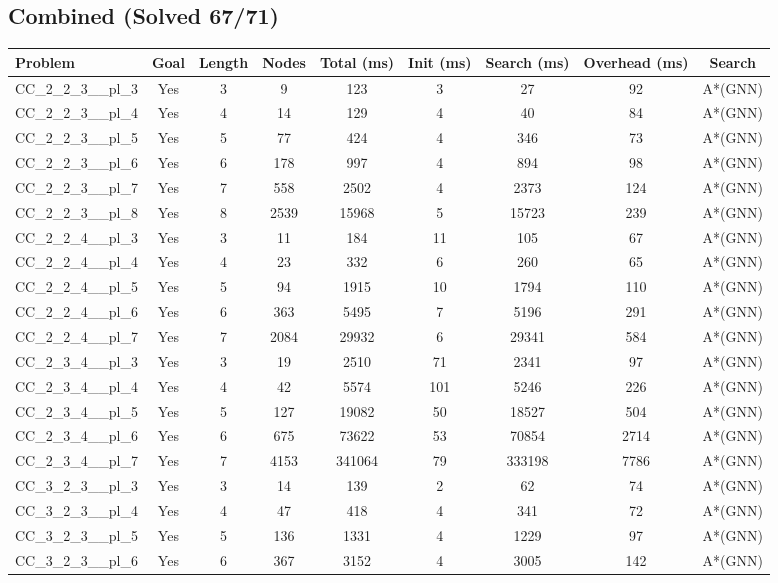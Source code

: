 \documentclass{article}
\begin{document}
\subsection*{Combined (Solved 67/71)}
\begin{tabular}{lcccccccc}
\toprule
Problem & Goal & Length & Nodes & Total (ms) & Init (ms) & Search (ms) & Overhead (ms) & Search \\
\midrule
CC\_2\_2\_3\_\_pl\_3 & Yes & 3 & 9 & 123 & 3 & 27 & 92 & A*(GNN) \\
CC\_2\_2\_3\_\_pl\_4 & Yes & 4 & 14 & 129 & 4 & 40 & 84 & A*(GNN) \\
CC\_2\_2\_3\_\_pl\_5 & Yes & 5 & 77 & 424 & 4 & 346 & 73 & A*(GNN) \\
CC\_2\_2\_3\_\_pl\_6 & Yes & 6 & 178 & 997 & 4 & 894 & 98 & A*(GNN) \\
CC\_2\_2\_3\_\_pl\_7 & Yes & 7 & 558 & 2502 & 4 & 2373 & 124 & A*(GNN) \\
CC\_2\_2\_3\_\_pl\_8 & Yes & 8 & 2539 & 15968 & 5 & 15723 & 239 & A*(GNN) \\
CC\_2\_2\_4\_\_pl\_3 & Yes & 3 & 11 & 184 & 11 & 105 & 67 & A*(GNN) \\
CC\_2\_2\_4\_\_pl\_4 & Yes & 4 & 23 & 332 & 6 & 260 & 65 & A*(GNN) \\
CC\_2\_2\_4\_\_pl\_5 & Yes & 5 & 94 & 1915 & 10 & 1794 & 110 & A*(GNN) \\
CC\_2\_2\_4\_\_pl\_6 & Yes & 6 & 363 & 5495 & 7 & 5196 & 291 & A*(GNN) \\
CC\_2\_2\_4\_\_pl\_7 & Yes & 7 & 2084 & 29932 & 6 & 29341 & 584 & A*(GNN) \\
CC\_2\_3\_4\_\_pl\_3 & Yes & 3 & 19 & 2510 & 71 & 2341 & 97 & A*(GNN) \\
CC\_2\_3\_4\_\_pl\_4 & Yes & 4 & 42 & 5574 & 101 & 5246 & 226 & A*(GNN) \\
CC\_2\_3\_4\_\_pl\_5 & Yes & 5 & 127 & 19082 & 50 & 18527 & 504 & A*(GNN) \\
CC\_2\_3\_4\_\_pl\_6 & Yes & 6 & 675 & 73622 & 53 & 70854 & 2714 & A*(GNN) \\
CC\_2\_3\_4\_\_pl\_7 & Yes & 7 & 4153 & 341064 & 79 & 333198 & 7786 & A*(GNN) \\
CC\_3\_2\_3\_\_pl\_3 & Yes & 3 & 14 & 139 & 2 & 62 & 74 & A*(GNN) \\
CC\_3\_2\_3\_\_pl\_4 & Yes & 4 & 47 & 418 & 4 & 341 & 72 & A*(GNN) \\
CC\_3\_2\_3\_\_pl\_5 & Yes & 5 & 136 & 1331 & 4 & 1229 & 97 & A*(GNN) \\
CC\_3\_2\_3\_\_pl\_6 & Yes & 6 & 367 & 3152 & 4 & 3005 & 142 & A*(GNN) \\

\end{tabular}
\end{document}
